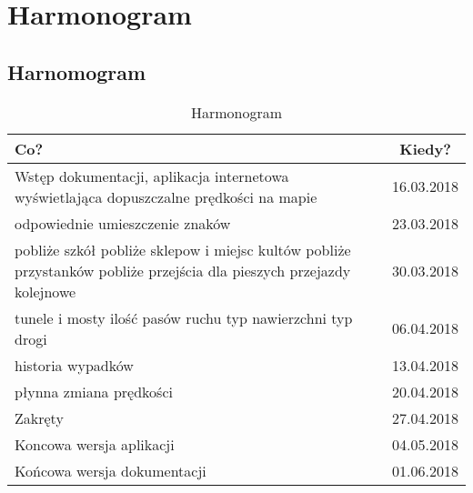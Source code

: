 \chapter{Harmonogram}
\label{cha:harmonogram}


\section{Harnomogram}
\label{sec:harmonogram}

\begin{table}[ht]
\centering
\caption{Harmonogram}
\label{Harmonogram}
\begin{tabular}{| p{12cm} | c |}
\hline
\textbf{Co?}                    & \textbf{Kiedy?} \\ \hline

Wstęp dokumentacji, aplikacja internetowa wyświetlająca dopuszczalne prędkości na mapie & 16.03.2018 \\ \hline

odpowiednie umieszczenie znaków & 23.03.2018 \\ \hline
pobliże szkół
pobliże sklepow i miejsc kultów
pobliże przystanków
pobliże przejścia dla pieszych 
przejazdy kolejnowe & 30.03.2018 \\ \hline

tunele i mosty
ilość pasów ruchu
typ nawierzchni
typ drogi & 06.04.2018 \\ \hline

historia wypadków & 13.04.2018 \\ \hline

płynna zmiana prędkości & 20.04.2018 \\ \hline

Zakręty & 27.04.2018 \\ \hline

Koncowa wersja aplikacji & 04.05.2018 \\ \hline

Końcowa wersja dokumentacji & 01.06.2018 \\ \hline
\end{tabular}
\end{table}
